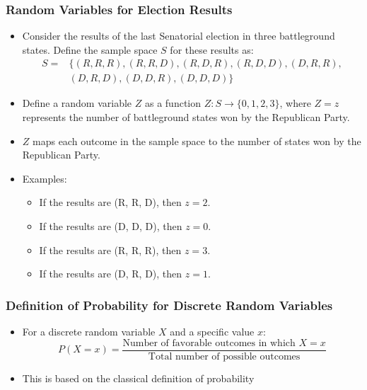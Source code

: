 \documentclass[handout]{beamer} %
\begin{document}
\begin{frame}
    \frametitle{Random Variables for Election Results}
    \begin{itemize}
        \item Consider the results of the last Senatorial election in three battleground states. Define the sample space \( S \) for these results as: \pause \vspace{-1em}
        \begin{align*}
        S =& \big\{ (R, R, R), (R, R, D), (R, D, R), (R, D, D), (D, R, R),\\
        & (D, R, D), (D, D, R), (D, D, D) \big\}
        \end{align*} \pause \vspace{-2.5em}
        \item Define a random variable \( Z \) as a function \( Z: S \rightarrow \{0, 1, 2, 3\} \), where \( Z=z \) represents the number of battleground states won by the Republican Party. \pause
        \item \( Z \) maps each outcome in the sample space to the number of states won by the Republican Party. \pause
        \item Examples: \pause
        \begin{itemize}
            \item If the results are (R, R, D), then \( z = 2 \). \pause
            \item If the results are (D, D, D), then \( z = 0 \). \pause
            \item If the results are (R, R, R), then \( z = 3 \). \pause
            \item If the results are (D, R, D), then \( z = 1 \). \pause
        \end{itemize}
    \end{itemize}
\end{frame}


\begin{frame}
    \frametitle{Definition of Probability for Discrete Random Variables}

    
     \pause 

    \begin{itemize}
        \item For a discrete random variable \( X \) and a specific value \( x \): \pause
        \[
        P(X = x) = \frac{\text{Number of favorable outcomes in which } X = x}{\text{Total number of possible outcomes}} 
        \] \pause \vspace{-1.0em}
        \item This is based on the classical definition of probability \pause
    \end{itemize}
\end{frame}
\end{document}
